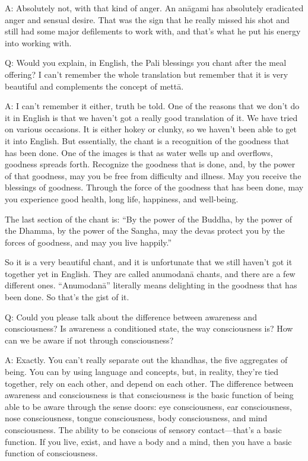\vspace{\the\qaskip}
A: Absolutely not, with that kind of anger. An anāgami has absolutely
eradicated anger and sensual desire. That was the sign that he really
missed his shot and still had some major defilements to work with, and
that’s what he put his energy into working with.

\vspace{\the\qaskip}
Q: Would you explain, in English, the Pali blessings you chant after the
meal offering? I can’t remember the whole translation but remember that
it is very beautiful and complements the concept of mettā.

\vspace{\the\qaskip}
A: I can’t remember it either, truth be told. One of the reasons that we
don’t do it in English is that we haven’t got a really good translation
of it. We have tried on various occasions. It is either hokey or clunky,
so we haven’t been able to get it into English. But essentially, the
chant is a recognition of the goodness that has been done. One of the
images is that as water wells up and overflows, goodness spreads forth.
Recognize the goodness that is done, and, by the power of that goodness,
may you be free from difficulty and illness. May you receive the
blessings of goodness. Through the force of the goodness that has been
done, may you experience good health, long life, happiness, and
well-being.

The last section of the chant is: “By the power of the Buddha, by the
power of the Dhamma, by the power of the Sangha, may the devas protect
you by the forces of goodness, and may you live happily.”

So it is a very beautiful chant, and it is unfortunate that we still
haven’t got it together yet in English. They are called anumodanā
chants, and there are a few different ones. “Anumodanā” literally means
delighting in the goodness that has been done. So that’s the gist of it.

\vspace{\the\qaskip}
Q: Could you please talk about the difference between awareness and
consciousness? Is awareness a conditioned state, the way consciousness
is? How can we be aware if not through consciousness?

\vspace{\the\qaskip}
A: Exactly. You can’t really separate out the khandhas, the five
aggregates of being. You can by using language and concepts, but, in
reality, they’re tied together, rely on each other, and depend on each
other. The difference between awareness and consciousness is that
consciousness is the basic function of being able to be aware through
the sense doors: eye consciousness, ear consciousness, nose
consciousness, tongue consciousness, body consciousness, and mind
consciousness. The ability to be conscious of sensory contact—that’s a
basic function. If you live, exist, and have a body and a mind, then you
have a basic function of consciousness.


